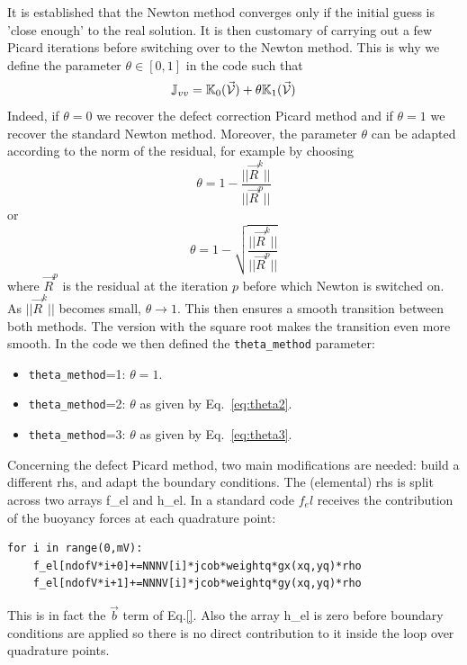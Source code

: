 It is established that the Newton method converges only if the initial guess is 'close enough'
to the real solution. It is then customary of carrying out a few Picard iterations 
before switching over to the Newton method. 
This is why we define the parameter $\theta\in[0,1]$ in the code such that 
\[
{\mathbb{J}}_{vv} = {\mathbb{K}}_0(\vec{\cal V})+\theta {\mathbb{K}}_1(\vec{\cal V})
\]
Indeed, if $\theta=0$ we recover the defect correction Picard method and
if $\theta=1$ we recover the standard Newton method. 
Moreover, the parameter $\theta$ can be adapted according to the norm of 
the residual, for example by choosing 
\begin{equation}
\theta = 1 - \frac{||\vec{R}^k||}{||\vec{R}^p||} 
\label{eq:theta2}
\end{equation}
or
\begin{equation}
\theta = 1 - \sqrt{\frac{||\vec{R}^k||}{||\vec{R}^p||}}
\label{eq:theta3}
\end{equation}
where $\vec{R}^p$ is the residual at the iteration $p$ before which Newton is switched on.
As $||\vec{R}^k||$ becomes small, $\theta \rightarrow 1$.
This then ensures a smooth transition between both methods. The version 
with the square root makes the transition even more smooth.
In the code we then defined the {\tt theta\_method} parameter:
\begin{itemize}
\item {\tt theta\_method}=1: $\theta=1$.
\item {\tt theta\_method}=2: $\theta$ as given by Eq.~\eqref{eq:theta2}.
\item {\tt theta\_method}=3: $\theta$ as given by Eq.~\eqref{eq:theta3}.
\end{itemize}


Concerning the defect Picard method, two main modifications 
are needed: build a different rhs, and adapt the boundary conditions. 
The (elemental) rhs is split across two arrays {\codefont f\_el} and {\codefont h\_el}.
In a standard code $f_el$ receives the contribution of the buoyancy forces at 
each quadrature point:
\begin{lstlisting}
for i in range(0,mV):
    f_el[ndofV*i+0]+=NNNV[i]*jcob*weightq*gx(xq,yq)*rho
    f_el[ndofV*i+1]+=NNNV[i]*jcob*weightq*gy(xq,yq)*rho
\end{lstlisting}
This is in fact the $\vec{b}$ term of Eq.\eqref{}. 
Also the array {\codefont h\_el} is zero before boundary conditions are
applied so there is no direct contribution to it inside the loop over 
quadrature points.

